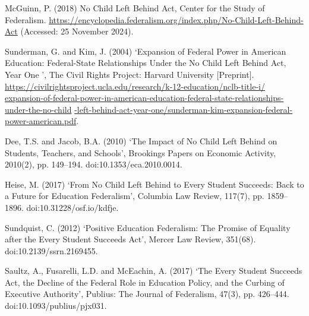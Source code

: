 \documentclass[11pt]{extarticle}
\begin{document}
\par \vspace{0.5cm}
\begin{hangparas}{.25in}{1}
McGuinn, P. (2018) No Child Left Behind Act, Center for the Study of Federalism. \url{https://encyclopedia.federalism.org/index.php/No-Child-Left-Behind-Act} (Accessed: 25 November 2024).
\end{hangparas}
\par \vspace{0.5cm}
\begin{hangparas}{.25in}{1}
Sunderman, G. and Kim, J. (2004) ‘Expansion of Federal Power in American Education: Federal-State Relationships Under the No Child Left Behind Act, Year One ’, The Civil Rights Project: Harvard University [Preprint]. \url{https://civilrightsproject.ucla.edu/research/k-12-education/nclb-title-i/} \url{expansion-of-federal-power-in-american-education-federal-state-relationships-under-the-no-child} \url{-left-behind-act-year-one/sunderman-kim-expansion-federal-power-american.pdf}. 
\end{hangparas}
\par \vspace{0.5cm}
\begin{hangparas}{.25in}{1}
Dee, T.S. and Jacob, B.A. (2010) ‘The Impact of No Child Left Behind on Students, Teachers, and Schools’, Brookings Papers on Economic Activity, 2010(2), pp. 149–194. doi:10.1353/eca.2010.0014. 
\end{hangparas}
\par \vspace{0.5cm}
\begin{hangparas}{.25in}{1}
Heise, M. (2017) ‘From No Child Left Behind to Every Student Succeeds: Back to a Future for Education Federalism’, Columbia Law Review, 117(7), pp. 1859–1896. doi:10.31228/osf.io/kdfje. 
\end{hangparas}
\par \vspace{0.5cm}
\begin{hangparas}{.25in}{1}
Sundquist, C. (2012) ‘Positive Education Federalism: The Promise of Equality after the Every Student Succeeds Act’, Mercer Law Review, 351(68). doi:10.2139/ssrn.2169455. 
\end{hangparas}
\par \vspace{0.5cm}
\begin{hangparas}{.25in}{1}
Saultz, A., Fusarelli, L.D. and McEachin, A. (2017) ‘The Every Student Succeeds Act, the Decline of the Federal Role in Education Policy, and the Curbing of Executive Authority’, Publius: The Journal of Federalism, 47(3), pp. 426–444. doi:10.1093/publius/pjx031. 
\end{hangparas}
\end{document}

